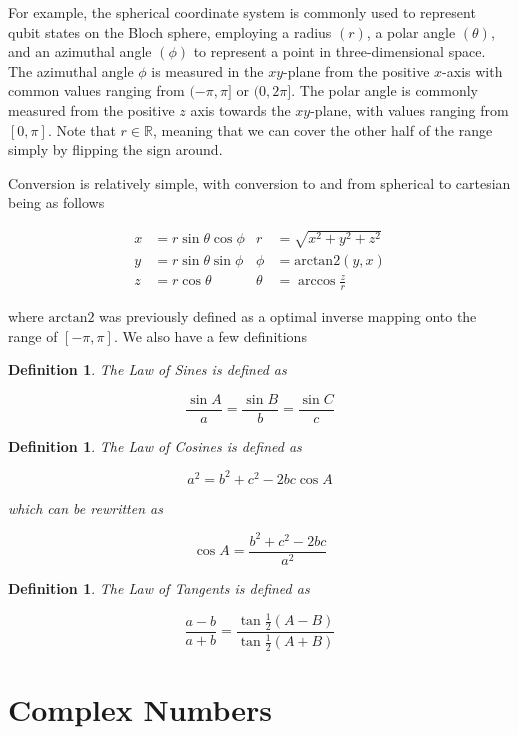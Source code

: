 \documentclass[12pt]{article}
\theoremstyle{plain}
\newtheorem{definition}[theorem]{Definition}
\theoremstyle{definition}
\begin{document}
For example, the spherical coordinate system is commonly used to represent qubit states on the Bloch sphere, employing a radius $(r)$, a polar angle $(\theta)$, and an azimuthal angle $(\phi)$ to represent a point in three-dimensional space. The azimuthal angle $\phi$ is measured in the $xy$-plane from the positive $x$-axis with common values ranging from $(-\pi, \pi]$ or $(0, 2\pi]$. The polar angle is commonly measured from the positive $z$ axis towards the $xy$-plane, with values ranging from $[0, \pi]$. Note that $r \in \mathbb{R}$, meaning that we can cover the other half of the range simply by flipping the sign around. 

Conversion is relatively simple, with conversion to and from spherical to cartesian being as follows

\begin{align*}
    x &= r \sin \theta \cos \phi &     r &= \sqrt{x^2 + y^2 + z^2} \\
    y &= r \sin \theta \sin \phi &     \phi &= \mathrm{arctan2} (y, x) \\
    z &= r \cos \theta &         \theta &= \arccos \frac{z}{r}
\end{align*}

where $\mathrm{arctan2}$ was previously defined as a optimal inverse mapping onto the range of $[- \pi, \pi]$. We also have a few definitions

\begin{definition}
    The Law of Sines is defined as 

    $$\frac{\sin A}{a} = \frac{\sin B}{b} = \frac{\sin C}{c}$$
\end{definition}

\begin{definition}
    The Law of Cosines is defined as 

    $$a^2 = b^2 + c^2 - 2bc \cos A$$

    which can be rewritten as 

    $$\cos A = \frac{b^2 + c^2 - 2bc}{a^2}$$
\end{definition}

\begin{definition}
    The Law of Tangents is defined as 

    $$\frac{a - b}{a + b} = \frac{\tan \frac{1}{2}(A - B)}{\tan \frac{1}{2}(A + B)}$$
\end{definition}


\break


\section{Complex Numbers}
\end{document}
